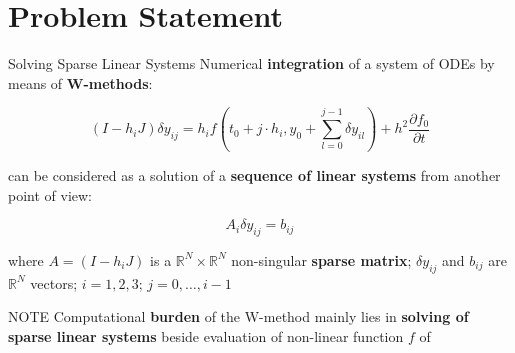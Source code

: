 \section{Problem Statement}

\ifPresentation
\begin{frame}[t]{Solving Sparse Linear Systems}
    \small
    \justifying
    Numerical \textbf{integration} of a system of ODEs by means of \textbf{W-methods}:
    
    \begin{equation}
	(I - h_{i}J)\delta y_{ij} = h_{i} f(t_{0} + j \cdot h_{i}, y_{0} + \sum^{j-1}_{l = 0} \delta y_{il}) + h^{2} \frac{\partial f_{0}}{\partial t}
    \end{equation}
    
    can be considered as a solution of a \textbf{sequence of linear systems} from another point of view:
    
    \begin{equation}
	A_{i} \delta y_{ij} =  b_{ij} 
    \end{equation}

    where $A = (I - h_{i}J)$ is a $\mathbb{R}^{N} \times \mathbb{R}^{N}$ non-singular \textbf{sparse matrix}; $\delta y_{ij}$  and $b_{ij}$ are $\mathbb{R}^{N}$ vectors; $i = 1, 2, 3$; $j=0, \dots, i - 1$\\
    
    \begin{block}{NOTE}
        Computational \textbf{burden} of the W-method mainly lies in \textbf{solving of sparse linear systems} beside evaluation of non-linear function $f$ of 
    \end{block}

\end{frame}
\fi

